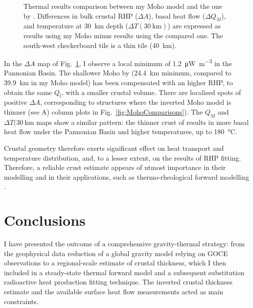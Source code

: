 \begin{figure}
	\begin{adjustbox}{center}
	\end{adjustbox}
	\caption[Thermal results comparison between my Moho model and the one by \textcite{Grad2009}.]{Thermal results comparison between my Moho model and the one by \textcite{Grad2009}. Differences in bulk crustal RHP ($\Delta A$), basal heat flow ($\Delta Q_M$), and temperature at 30~\si{\kilo \metre} depth ($\Delta T(30~\mathrm{km})$) are expressed as results using my Moho minus results using the compared one. The south-west checkerboard tile is a thin tile (40~\si{\kilo \metre}).}
	\label{fig:CompGradMoho}
\end{figure}

In the $\Delta A$ map of Fig.~\ref{fig:CompGradMoho}, I observe a local minimum of \SI{1.2}{\micro \watt \per \cubic \metre} in the Pannonian Basin.
The shallower Moho by \textcite{Grad2009} (24.4~\si{\kilo \metre} minimum, compared to 39.9~\si{\kilo \metre} in my Moho model) has been compensated with an higher RHP, to obtain the same $Q_C$ with a smaller crustal volume.
There are localised spots of positive $\Delta A$, corresponding to structures where the inverted Moho model is thinner (see A) column plots in Fig.~\ref{fig:MohoComparisons}).
The $Q_M$ and $\Delta T(30~\mathrm{km}$ maps show a similar pattern: the thinner crust of \textcite{Grad2009} results in more basal heat flow under the Pannonian Basin and higher temperatures, up to \SI[retain-explicit-plus]{+180}{\celsius}.

Crustal geometry therefore exerts significant effect on heat transport and temperature distribution, and, to a lesser extent, on the results of RHP fitting.
Therefore, a reliable crust estimate appears of utmost importance in their modelling and in their applications, such as thermo-rheological forward modelling \parencite[e.g. ][]{Burov1995}.

\section{Conclusions}
\label{s:Appl:Concl}

I have presented the outcome of a comprehensive gravity-thermal strategy: from the geophysical data reduction of a global gravity model relying on GOCE observations to a regional-scale estimate of crustal thickness, which I then included in a steady-state thermal forward model and a subsequent substitution radioactive heat production fitting technique.
The inverted crustal thickness estimate and the available surface heat flow measurements acted as main constraints.

